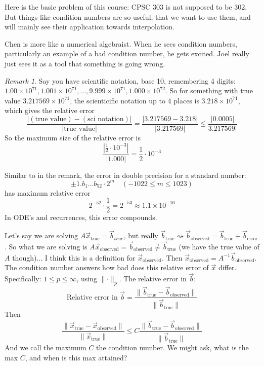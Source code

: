 \documentclass{article}
\theoremstyle{plain}
\theoremstyle{remark}
\newtheorem{remark}{Remark}
\begin{document}
Here is the basic problem of this course: CPSC 303 is not supposed to be 302.
But things like condition numbers are so useful, that we want to use them,
and will mainly see their application towards interpolation.

Chen is more like a numerical algebraist.
When he sees condition numbers, particularly an example of a bad condition number,
he gets excited.
Joel really just sees it as a tool that something is going wrong.

\begin{remark}
	Say you have scientific notation, base 10, remembering 4 digits:
	$1.00 \times 10^{71}, 1.001 \times 10^{71}, \dots,
	9.999 \times 10^{71}, 1.000 \times 10^{72}$.
	So for something with true value $3.217569 \times 10^{71}$,
	the scienticific notation up to $4$ places is $3.218 \times 10^{71}$,
	which gives the relative error
	\[
		\frac{|(\text{true value}) - (\text{sci notation})|}{|\text{true value}|}
		= \frac{|3.217569 - 3.218|}{|3.217569|}
		\leq \frac{|0.0005|}{3.217569|}
	\]
	So the maximum size of the relative error is
	\[
		\frac{| \frac{1}{2} \cdot 10^{-3}|}{|1.000|} = \frac12 \cdot 10^{-3}
	\]
\end{remark}

Similar to in the remark, the error in double precision for a standard number:
\[
	\pm 1.b_1\dots b_{52} \cdot 2^m \quad (-1022 \leq m \leq 1023)
\]
has maximum relative error
\[
	2^{-52} \cdot \frac12 = 2^{-53} \approx 1.1 \times 10^{-16}
\]
In ODE's and recurrences, this error compounds.

Let's say we are solving $A \vec{x}_{\text{true}} = \vec{b}_{true}$,
but really $\vec{b}_{\text{true}} \rightsquigarrow \vec{b}_{\text{observed}}
= \vec{b}_{\text{true}} + \vec{b}_{\text{error}}$.
So what we are solving is $A \vec{x}_{\text{observed}} = \vec{b}_{\text{observed}}
\neq \vec{b}_{\text{true}}$ (we have the true value of $A$ though)...
I think this is a definition for $\vec{x}_{\text{observed}}$.
Then $\vec{x}_{\text{observed}} = A^{-1} \vec{b}_{\text{observed}}$.
The condition number answers how bad does this relative error of $\vec{x}$ differ.
Specifically: $1 \leq p \leq \infty$, using $\lVert \cdot \rVert_p$.
The relative error in $\vec{b}$:
\[
	\text{Relative error in } \vec{b}
	= \frac{\lVert\vec{b}_{\text{true}} - \vec{b}_{\text{observed}}\rVert}
	{\lVert \vec{b}_{\text{true}}\rVert}
\]
Then
\[
	\frac{\lVert\vec{x}_{\text{true}} - \vec{x}_{\text{observed}}\rVert}
	{\lVert \vec{x}_{\text{true}}\rVert}
	\leq C\frac{\lVert\vec{b}_{\text{true}} - \vec{b}_{\text{observed}}\rVert}
	{\lVert \vec{b}_{\text{true}}\rVert}
\]
And we call the maximum $C$ the condition number.
We might ask, what is the max $C$, and when is this max attained?
\end{document}
